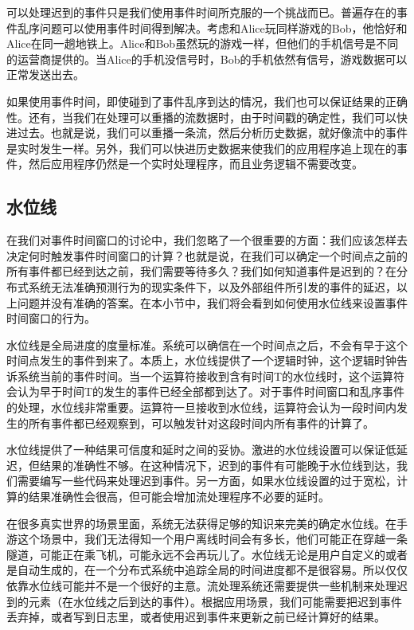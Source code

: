 \documentclass[cn,11pt,chinese]{elegantbook}
\begin{document}
可以处理迟到的事件只是我们使用事件时间所克服的一个挑战而已。普遍存在的事件乱序问题可以使用事件时间得到解决。考虑和Alice玩同样游戏的Bob，他恰好和Alice在同一趟地铁上。Alice和Bob虽然玩的游戏一样，但他们的手机信号是不同的运营商提供的。当Alice的手机没信号时，Bob的手机依然有信号，游戏数据可以正常发送出去。

如果使用事件时间，即使碰到了事件乱序到达的情况，我们也可以保证结果的正确性。还有，当我们在处理可以重播的流数据时，由于时间戳的确定性，我们可以快进过去。也就是说，我们可以重播一条流，然后分析历史数据，就好像流中的事件是实时发生一样。另外，我们可以快进历史数据来使我们的应用程序追上现在的事件，然后应用程序仍然是一个实时处理程序，而且业务逻辑不需要改变。

\subsection{水位线}

在我们对事件时间窗口的讨论中，我们忽略了一个很重要的方面：我们应该怎样去决定何时触发事件时间窗口的计算？也就是说，在我们可以确定一个时间点之前的所有事件都已经到达之前，我们需要等待多久？我们如何知道事件是迟到的？在分布式系统无法准确预测行为的现实条件下，以及外部组件所引发的事件的延迟，以上问题并没有准确的答案。在本小节中，我们将会看到如何使用水位线来设置事件时间窗口的行为。

水位线是全局进度的度量标准。系统可以确信在一个时间点之后，不会有早于这个时间点发生的事件到来了。本质上，水位线提供了一个逻辑时钟，这个逻辑时钟告诉系统当前的事件时间。当一个运算符接收到含有时间T的水位线时，这个运算符会认为早于时间T的发生的事件已经全部都到达了。对于事件时间窗口和乱序事件的处理，水位线非常重要。运算符一旦接收到水位线，运算符会认为一段时间内发生的所有事件都已经观察到，可以触发针对这段时间内所有事件的计算了。

水位线提供了一种结果可信度和延时之间的妥协。激进的水位线设置可以保证低延迟，但结果的准确性不够。在这种情况下，迟到的事件有可能晚于水位线到达，我们需要编写一些代码来处理迟到事件。另一方面，如果水位线设置的过于宽松，计算的结果准确性会很高，但可能会增加流处理程序不必要的延时。

在很多真实世界的场景里面，系统无法获得足够的知识来完美的确定水位线。在手游这个场景中，我们无法得知一个用户离线时间会有多长，他们可能正在穿越一条隧道，可能正在乘飞机，可能永远不会再玩儿了。水位线无论是用户自定义的或者是自动生成的，在一个分布式系统中追踪全局的时间进度都不是很容易。所以仅仅依靠水位线可能并不是一个很好的主意。流处理系统还需要提供一些机制来处理迟到的元素（在水位线之后到达的事件）。根据应用场景，我们可能需要把迟到事件丢弃掉，或者写到日志里，或者使用迟到事件来更新之前已经计算好的结果。
\end{document}
